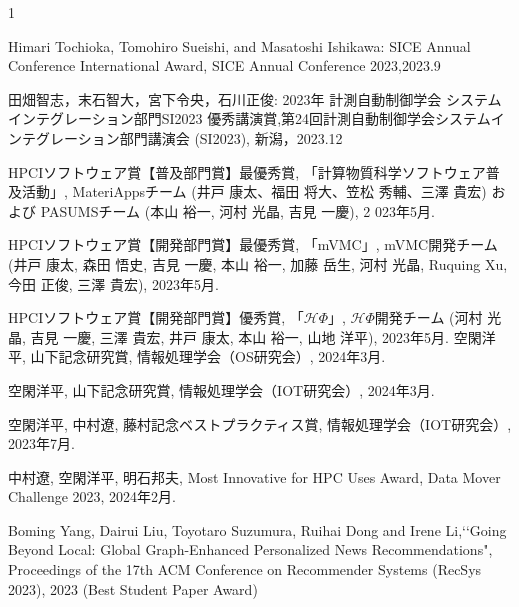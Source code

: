 \begin{受賞}{1}

Himari Tochioka, Tomohiro Sueishi, and Masatoshi Ishikawa: SICE Annual Conference International Award, SICE Annual Conference 2023,2023.9

田畑智志，末石智大，宮下令央，石川正俊: 2023年 計測自動制御学会 システムインテグレーション部門SI2023 優秀講演賞,第24回計測自動制御学会システムインテグレーション部門講演会 (SI2023), 新潟，2023.12

HPCIソフトウェア賞【普及部門賞】最優秀賞, 
「計算物質科学ソフトウェア普及活動」, 
MateriAppsチーム (井戸 康太、福田 将大、笠松 秀輔、三澤 貴宏) および PASUMSチーム (本山 裕一, 河村 光晶, 吉見 一慶), 2
023年5月.

HPCIソフトウェア賞【開発部門賞】最優秀賞,
「mVMC」, 
mVMC開発チーム (井戸 康太, 森田 悟史, 吉見 一慶, 本山 裕一, 加藤 岳生, 河村 光晶, Ruquing Xu, 今田 正俊, 三澤 貴宏), 
2023年5月.

HPCIソフトウェア賞【開発部門賞】優秀賞, 
「$\mathcal{H}\Phi$」, 
$\mathcal{H}\Phi$開発チーム (河村 光晶, 吉見 一慶, 三澤 貴宏, 井戸 康太, 本山 裕一, 山地 洋平), 
2023年5月.
空閑洋平, 山下記念研究賞, 情報処理学会（OS研究会）, 2024年3月.

空閑洋平, 山下記念研究賞, 情報処理学会（IOT研究会）, 2024年3月.

空閑洋平, 中村遼, 藤村記念ベストプラクティス賞, 情報処理学会（IOT研究会）, 2023年7月.

中村遼, 空閑洋平, 明石邦夫, Most Innovative for HPC Uses Award, Data Mover Challenge 2023, 2024年2月.



Boming Yang, Dairui Liu, Toyotaro Suzumura, Ruihai Dong and Irene Li,\lq\lq Going Beyond Local: Global Graph-Enhanced Personalized News Recommendations", Proceedings of the 17th ACM Conference on Recommender Systems  (RecSys 2023), 2023 (Best Student Paper Award)

\end{受賞}





